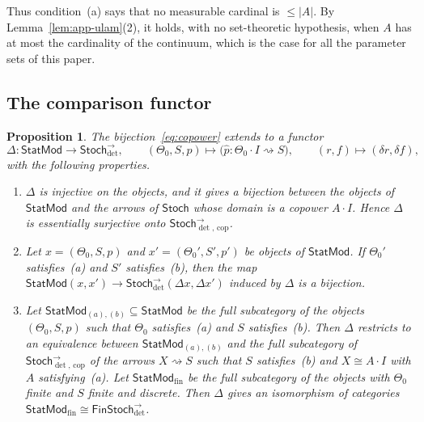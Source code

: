 \documentclass[11pt,a4paper]{article}
\theoremstyle{plain}
\newtheorem{proposition}[theorem]{Proposition}
\theoremstyle{definition}
\theoremstyle{remark}
\newcommand{\cat}[1]{\mathsf{#1}}
\newcommand{\Stoch}{\cat{Stoch}}
\newcommand{\FinStoch}{\cat{FinStoch}}
\newcommand{\del}{\delta}
\newcommand{\StatMod}{\cat{StatMod}}
\newcommand{\Jc}{\Delta}
\newcommand{\Arrdet}[1]{#1^{\rightarrow}_{\det}}
\newcommand{\Arrcop}[1]{#1^{\rightarrow}_{\det,\,\mathrm{cop}}}
\begin{document}
Thus condition~(a) says that no measurable cardinal is $\le |A|$. By
Lemma~\ref{lem:app-ulam}(2), it holds, with no set-theoretic hypothesis, when
$A$ has at most the cardinality of the continuum, which is the case for all the
parameter sets of this paper.

\subsection{The comparison functor}

\begin{proposition}\label{wprop:copower}
The bijection~\eqref{eq:copower} extends to a functor
\[
\Jc \colon \StatMod \longrightarrow \Arrdet{\Stoch},
\qquad
(\Theta_0, S, p) \longmapsto
\bigl(\widehat{p} \colon \Theta_0 \cdot I \rightsquigarrow S\bigr),
\qquad
(r,f) \longmapsto (\del r,\del f),
\]
with the following properties.
\begin{enumerate}
\item $\Jc$ is injective on the objects, and it gives a bijection between the
objects of $\StatMod$ and the arrows of $\Stoch$ whose domain is a copower
$A \cdot I$. Hence $\Jc$ is essentially surjective onto $\Arrcop{\Stoch}$.
\item Let $x = (\Theta_0,S,p)$ and $x' = (\Theta_0',S',p')$ be objects of
$\StatMod$. If $\Theta_0'$ satisfies~(a) and $S'$ satisfies~(b), then the map
$\StatMod(x,x') \to \Arrdet{\Stoch}(\Jc x,\Jc x')$ induced by $\Jc$ is a
bijection.
\item Let $\StatMod_{(a),(b)} \subseteq \StatMod$ be the full subcategory of
the objects $(\Theta_0,S,p)$ such that $\Theta_0$ satisfies~(a) and $S$
satisfies~(b). Then $\Jc$ restricts to an equivalence between
$\StatMod_{(a),(b)}$ and the full subcategory of $\Arrcop{\Stoch}$ of the
arrows $X \rightsquigarrow S$ such that $S$ satisfies~(b) and
$X \cong A\cdot I$ with $A$ satisfying~(a). Let $\StatMod_{\mathrm{fin}}$ be the
full subcategory of the objects with $\Theta_0$ finite and $S$ finite and
discrete. Then $\Jc$ gives an isomorphism of categories
$\StatMod_{\mathrm{fin}} \cong \Arrdet{\FinStoch}$.
\end{enumerate}
\end{proposition}
\end{document}
